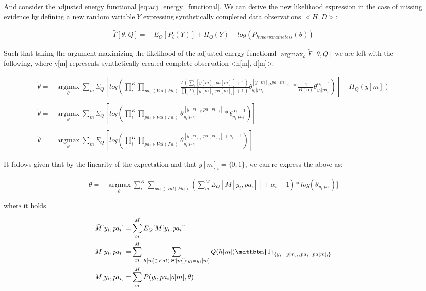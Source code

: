 \documentclass[11pt]{article}
\begin{document}
\begin{article}
And consider the adjusted energy functional
\ref{eq:adj_energy_functional}. We can derive the new likelihood
expression in the case of missing evidence by defining a new
random variable \(Y\) expressing synthetically completed data observations \(<H,
   D>\):

\begin{align} \label{eq:dirichlet-multinomial-likelihood}
\tilde{F}[\theta, Q] =& \ E_Q[P_\theta(Y)] + H_Q (Y) + log(P_{hyperparameters}(\theta))
\end{align}

Such that taking the argument maximizing the likelihood of the
adjusted energy functional \(\operatorname*{argmax}_{\theta}
   \tilde{F}[\theta, Q]\) we are left with the following, where y[m]
represents synthetically created complete observation <h[m],
d[m]>:

\begin{align} \label{eq:first-order-condition}
\tilde{\theta} =& \operatorname*{argmax}_{\theta} \sum_m E_Q[log(\prod_i^K \prod_{pa_i \in Val(Pa_i)}
\frac{\Gamma(\sum_i [y[m]_i, pa[m]_i] + 1)}{\prod_i \Gamma([y[m]_i,pa[m]_i] + 1)} \theta_{y_i | pa_{i}}^{[y[m]_i, pa[m]_i]} * \frac{1}{B(\alpha)} \theta_{y_i | pa_{i}}^{\alpha_i - 1})] + H_Q (y[m]) \\
\nonumber\\   
\tilde{\theta} =& \operatorname*{argmax}_{\theta} \sum_m E_Q[log(\prod_i^K \prod_{pa_i \in Val(Pa_i)} \theta_{y_i | pa_{i}}^{[y[m]_i, pa[m]_i]} * \theta_{y_i | pa_{i}}^{\alpha_i - 1})]\\
\nonumber\\   
\tilde{\theta} =& \operatorname*{argmax}_{\theta} \sum_m E_Q[log(\prod_i^K \prod_{pa_i \in Val(Pa_i)} \theta_{y_i | pa_{i}}^{[y[m]_i, pa[m]_i] + \alpha_i - 1})] 
\end{align}

It follows given that by the linearity of the expectation and that
\(y[m]_i = \{0,1\}\), we can re-express the above as:

\begin{align} \label{eq:solution1}
\tilde{\theta} =& \operatorname*{argmax}_{\theta} \sum_i^K \sum_{pa_i \in Val(Pa_i)} (\sum_m^M E_Q[M[y_i, pa_{i}]] + \alpha_i - 1) * log(\theta_{y_i | pa_{i}})] 
\end{align}

where it holds

\begin{align} \label{eq:expected_sufficient}
\bar{M}[y_i, pa_{i}]  =& \sum_m^M E_Q[M[y_i, pa_{i}]]\\
\bar{M}[y_i, pa_{i}]  =& \sum_m^M \sum_{h[m] \in Val(\mathscr{H}[m]): y_i = y_i[m]} Q(h[m]) \mathbbm{1}_{\{y_i = y[m]_i, pa_i = pa[m]_i\}}\\
\bar{M}[y_i, pa_{i}]  =& \sum_m^M P(y_i, pa_i | d[m], \theta)
\end{align}


\end{article}
\end{document}

